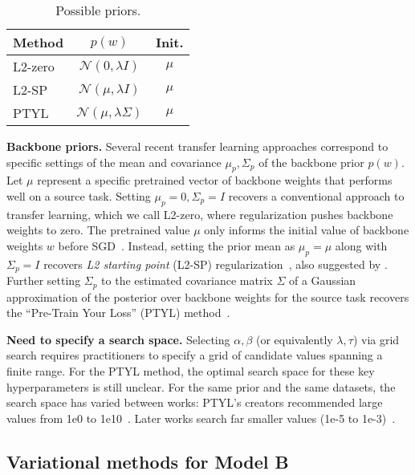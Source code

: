 \setlength{\tabcolsep}{4pt}
\setlength{\columnsep}{6pt} %
\begin{wraptable}[7]{R}{117.43875pt}
    \caption{Possible priors.}
    \label{tab:transfer_learning_methods}
    \centering
    \footnotesize
    \begin{tabular}{lcc}
        \hline
        \bfseries Method & \bfseries $p(w)$ & Init. \\
        \hline
        L2-zero & $\mathcal{N}(0, \lambda I)$ & $\mu$ \\
        L2-SP & $\mathcal{N}(\mu, \lambda I)$ & $\mu$ \\
        PTYL & $\mathcal{N}(\mu, \lambda \Sigma)$ & $\mu$ \\
        \hline
    \end{tabular}
\end{wraptable}
\setlength{\tabcolsep}{6pt}
\textbf{Backbone priors.}
Several recent transfer learning approaches correspond to specific settings of the mean and covariance $\mu_p, \Sigma_p$ of the backbone prior $p(w)$. Let $\mu$ represent a specific pretrained vector of backbone weights that performs well on a source task.
Setting $\mu_p{=}0, \Sigma_p{=}I$ recovers a conventional approach to transfer learning, which we call L2-zero, where regularization pushes backbone weights to zero. The pretrained value $\mu$ only informs the initial value of backbone weights $w$ before SGD~\citep{xuhong2018explicit,harvey2024transfer}.  Instead, setting the prior mean as $\mu_p = \mu$ along with $\Sigma_p = I$ recovers \emph{L2 starting point} (L2-SP) regularization~\citep{xuhong2018explicit}, also suggested by \citet{chelba2006adaptation}. Further setting $\Sigma_p$ to the estimated covariance matrix $\Sigma$ of a Gaussian approximation of the posterior over backbone weights for the source task recovers the ``Pre-Train Your Loss'' (PTYL) method~\citep{shwartz2022pre}.

\textbf{Need to specify a search space.}
Selecting $\alpha,\beta$ (or equivalently $\lambda,\tau$) via grid search requires practitioners to specify a grid of candidate values spanning a finite range.
For the PTYL method, the optimal search space for these key hyperparameters is still unclear.
For the same prior and the same datasets, the search space has varied between works: PTYL's creators recommended large values from 1e0 to 1e10~\citep{shwartz2022pre}.
Later works search far smaller values (1e-5 to 1e-3)~\citep{rudner2024finetuning}.

\subsection{Variational methods for Model B}

